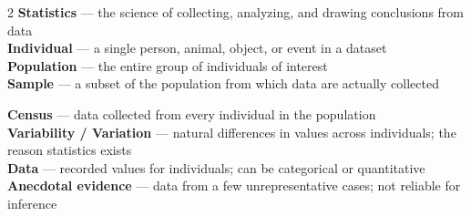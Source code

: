 \documentclass[aspectratio=169, 11pt]{beamer}
\begin{document}
{
\begin{frame}[t, plain]
  \vspace{1.05cm}\par
  \hspace{0.4cm}%
  \begin{minipage}{0.93\textwidth}
    \vspace{1em}
    \footnotesize
    \begin{multicols}{2}
      \textbf{\color{greenacc}Statistics} --- the science of collecting,
        analyzing, and drawing conclusions from data\\[4pt]
      \textbf{\color{greenacc}Individual} --- a single person, animal, object,
        or event in a dataset\\[4pt]
      \textbf{\color{greenacc}Population} --- the entire group of individuals
        of interest\\[4pt]
      \textbf{\color{greenacc}Sample} --- a subset of the population from which
        data are actually collected

      \columnbreak

      \textbf{\color{greenacc}Census} --- data collected from every individual
        in the population\\[4pt]
      \textbf{\color{greenacc}Variability / Variation} --- natural differences
        in values across individuals; the reason statistics exists\\[4pt]
      \textbf{\color{greenacc}Data} --- recorded values for individuals;
        can be categorical or quantitative\\[4pt]
      \textbf{\color{greenacc}Anecdotal evidence} --- data from a few
        unrepresentative cases; not reliable for inference
    \end{multicols}
  \end{minipage}
\end{frame}
}
\end{document}
